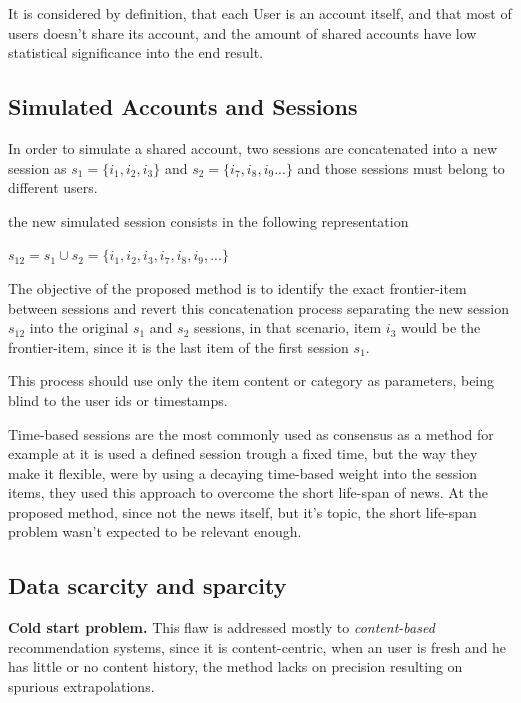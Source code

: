 \documentclass[ecp,tc,english]{iiufrgs}
\begin{document}
    It is considered by definition, that each User is an account itself, and that most of users doesn't share its account, and the amount of shared accounts have low  statistical significance into the end result.
    
        \subsection{Simulated Accounts and Sessions}
        In order to simulate a shared account, two sessions are concatenated into a new session as \(s_{1} = \{i_{1}, i_{2}, i_{3}\}\) and  \(s_{2} = \{i_{7}, i_{8}, i_{9} ...\}\) and those sessions must belong to different users.
    
        the new simulated session consists in the following representation
    
        \(s_{12} =  s_{1} \cup  s_{2} =  \{i_{1}, i_{2}, i_{3}, i_{7}, i_{8}, i_{9}, ...\}\)
    
        The objective of the proposed method is to identify the exact frontier-item between sessions and revert this concatenation process separating the new session  \(s_{12}\) into the original \(s_{1}\) and \(s_{2}\) sessions, in that scenario, item \(i_{3}\) would be the frontier-item, since it is the last item of the first session \(s_{1}\).
    
        This process should use only the item content or category as parameters, being blind to the user ids or timestamps.    
        
        
        
        Time-based sessions are the most commonly used as consensus as a method for example at \cite{10.1145/3184558.3191582} it is used a defined session trough a fixed time, but the way they make it flexible, were by using a decaying time-based weight into the session items, they used this approach to overcome the short life-span of news. At the proposed method, since not the news itself, but it's topic, the short life-span problem wasn't expected to be relevant enough.
    
        \subsection{Data scarcity and sparcity} \label{data_scarcity_and_sparcity}
        \textbf{Cold start problem.} This flaw is addressed mostly to \textit{content-based} recommendation systems, since it is content-centric, when an user is fresh and he has little or no content history, the method lacks on precision resulting on spurious extrapolations.
    
\end{document}
